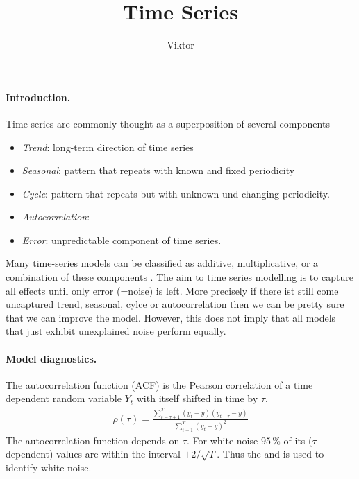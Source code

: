 \documentclass[12pt,a4paper]{article}
\begin{document}

\title{Time Series}
\author{Viktor}
\maketitle
\paragraph{Introduction.}
Time series are commonly thought as a superposition of several components
\begin{itemize}
	\item \textit{Trend}: long-term direction of time series
	\item \textit{Seasonal}: pattern that repeats with known and fixed periodicity 
	\item \textit{Cycle}: pattern that repeats but with unknown und changing periodicity.
	\item \textit{Autocorrelation}:
	\item \textit{Error}: unpredictable component of time series.
\end{itemize}

Many time-series models can be classified as additive, multiplicative, or a combination of these components \cite{hyndman_forecasting_with_exponential_smoothing}. The aim to time series modelling is to capture all effects until only error (=noise) is left. More precisely if there ist still come uncaptured trend, seasonal, cylce or autocorrelation then we can be pretty sure that we can improve the model. However, this does not imply that all models that just exhibit unexplained noise perform equally.  
 
\paragraph{Model diagnostics.}
The autocorrelation function (ACF) is the Pearson correlation of a time dependent random variable $Y_t$ with itself shifted in time by $\tau$.
\begin{align}
	\rho(\tau) =  \frac {\sum_{t=\tau+1} ^ T  \left(y_t - \bar y\right) \left(y_{t-\tau} - \bar y\right) }{\sum_{t=1} ^ T (y_t - \bar y)^2 }
\end{align}
The autocorrelation function depends on $\tau$. For white noise $95\,\%$ of its ($\tau$-dependent) values are within the interval $\pm2/\sqrt{T}$. Thus the  and is used to identify white noise. 
\cite{hyndman_forecasting_principles_2018}
\end{document}
